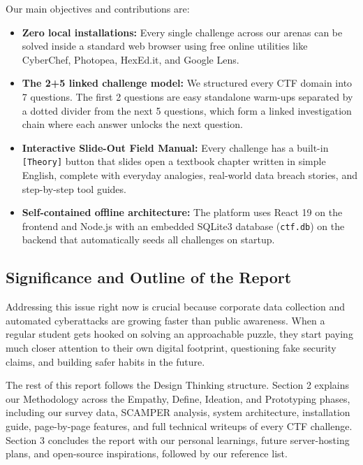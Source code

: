 \documentclass[11pt,a4paper]{article}
\begin{document}
Our main objectives and contributions are:
\begin{itemize}
    \item \textbf{Zero local installations:} Every single challenge across our arenas can be solved inside a standard web browser using free online utilities like CyberChef, Photopea, HexEd.it, and Google Lens.
    \item \textbf{The 2+5 linked challenge model:} We structured every CTF domain into 7 questions. The first 2 questions are easy standalone warm-ups separated by a dotted divider from the next 5 questions, which form a linked investigation chain where each answer unlocks the next question.
    \item \textbf{Interactive Slide-Out Field Manual:} Every challenge has a built-in \texttt{[Theory]} button that slides open a textbook chapter written in simple English, complete with everyday analogies, real-world data breach stories, and step-by-step tool guides.
    \item \textbf{Self-contained offline architecture:} The platform uses React 19 on the frontend and Node.js with an embedded SQLite3 database (\texttt{ctf.db}) on the backend that automatically seeds all challenges on startup.
\end{itemize}

\subsection{Significance and Outline of the Report}
Addressing this issue right now is crucial because corporate data collection and automated cyberattacks are growing faster than public awareness. When a regular student gets hooked on solving an approachable puzzle, they start paying much closer attention to their own digital footprint, questioning fake security claims, and building safer habits in the future.

The rest of this report follows the Design Thinking structure. Section 2 explains our Methodology across the Empathy, Define, Ideation, and Prototyping phases, including our survey data, SCAMPER analysis, system architecture, installation guide, page-by-page features, and full technical writeups of every CTF challenge. Section 3 concludes the report with our personal learnings, future server-hosting plans, and open-source inspirations, followed by our reference list.

\clearpage

\end{document}
